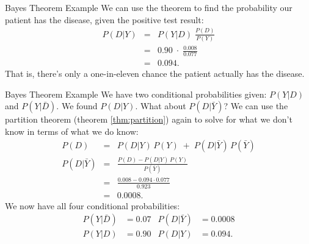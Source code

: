 \begin{frame}{Bayes Theorem  Example }
We can use the theorem to find the probability our patient has the
disease, given the positive test result:
\begin{eqnarray*}
	P(D|Y) &=& P(Y|D) \; \frac{P(D)}{P(Y)} \\
	&=& 0.90 \;\cdot\; \frac{0.008}{0.077} \\
	&=& 0.094.
\end{eqnarray*}
That is, there's only a one-in-eleven chance the patient actually has the
disease.
\end{frame}

\begin{frame}{Bayes Theorem  Example }
We have two conditional probabilities given:  $P(Y|D)$ and $P(Y|\bar{D})$.  We
found $P(D|Y)$.  What about $P(D|\bar{Y})$?  We can use the  partition theorem
(theorem \ref{thm:partition}) again to solve for what we don't know in terms of
what we do know:
\begin{eqnarray*}
	P(D) &=& P(D|Y)\,P(Y) \;+\; P(D|\bar{Y})\,P(\bar{Y}) \\
	P(D|\bar{Y}) &=& \frac{P(D) - P(D|Y)\,P(Y)}{P(\bar{Y})} \\
	&=& \frac{0.008 - 0.094 \cdot 0.077}{0.923} \\
	&=& 0.0008.
\end{eqnarray*}
We now have all four conditional probabilities:
\begin{align*}
	P(Y|\bar{D}) &= 0.07  & P(D|\bar{Y}) &= 0.0008 \\
	P(Y|D)     &= 0.90  & P(D|Y)     &= 0.094.
\end{align*}
\end{frame}

